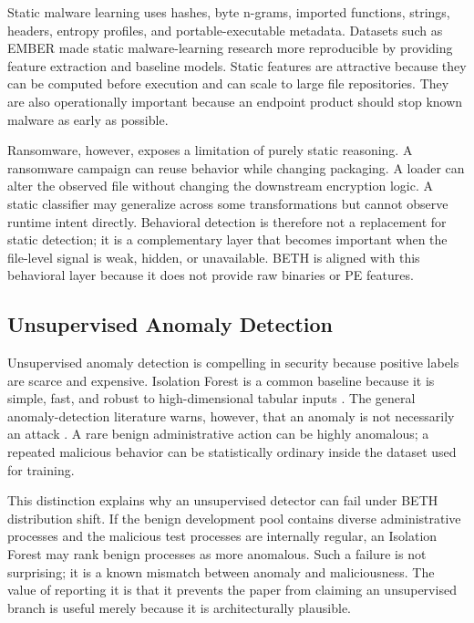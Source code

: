\documentclass[10pt,journal,compsoc]{IEEEtran}
\begin{document}
Static malware learning uses hashes, byte n-grams, imported functions, strings, headers, entropy profiles, and portable-executable metadata. Datasets such as EMBER \cite{anderson2018} made static malware-learning research more reproducible by providing feature extraction and baseline models. Static features are attractive because they can be computed before execution and can scale to large file repositories. They are also operationally important because an endpoint product should stop known malware as early as possible.

Ransomware, however, exposes a limitation of purely static reasoning. A ransomware campaign can reuse behavior while changing packaging. A loader can alter the observed file without changing the downstream encryption logic. A static classifier may generalize across some transformations but cannot observe runtime intent directly. Behavioral detection is therefore not a replacement for static detection; it is a complementary layer that becomes important when the file-level signal is weak, hidden, or unavailable. BETH is aligned with this behavioral layer because it does not provide raw binaries or PE features.

\subsection{Unsupervised Anomaly Detection}

Unsupervised anomaly detection is compelling in security because positive labels are scarce and expensive. Isolation Forest is a common baseline because it is simple, fast, and robust to high-dimensional tabular inputs \cite{liu2008}. The general anomaly-detection literature warns, however, that an anomaly is not necessarily an attack \cite{chandola2009}. A rare benign administrative action can be highly anomalous; a repeated malicious behavior can be statistically ordinary inside the dataset used for training.

This distinction explains why an unsupervised detector can fail under BETH distribution shift. If the benign development pool contains diverse administrative processes and the malicious test processes are internally regular, an Isolation Forest may rank benign processes as more anomalous. Such a failure is not surprising; it is a known mismatch between anomaly and maliciousness. The value of reporting it is that it prevents the paper from claiming an unsupervised branch is useful merely because it is architecturally plausible.
\end{document}

